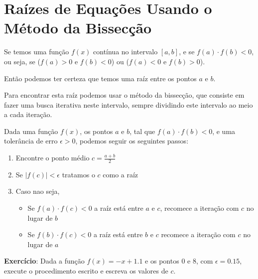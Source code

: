 \documentclass[12pt]{article}
\begin{document}
\break





\section{Raízes de Equações Usando o Método da Bissecção}

Se temos uma função $f(x)$ 
contínua no intervalo $[a, b]$, 
e se $f(a)\cdot f(b) < 0$, ou seja, 
se ($f(a)>0$ e $f(b)<0$) ou 
($f(a)<0$ e $f(b)>0$).

Então podemos ter certeza que temos uma raíz entre os
pontos $a$ e $b$.

Para encontrar esta raíz podemos usar o método da bissecção,
que consiste em fazer uma busca iterativa neste intervalo,
sempre dividindo este intervalo ao meio a cada iteração.

Dada uma função $f(x)$, os pontos $a$ e $b$, 
tal que $f(a)\cdot f(b)<0$, 
e uma tolerância de erro $\epsilon>0$,
podemos seguir os seguintes passos:

\begin{enumerate}
   \item Encontre o ponto médio $c = \frac{a+b}{2}$
   \item Se $|f(c)|<\epsilon$ tratamos o $c$ como a raíz
   \item Caso nao seja,
   \begin{itemize}
      \item Se $f(a)\cdot f(c)<0$ a raíz está entre $a$ e $c$,
      recomece a iteração com $c$ no lugar de $b$
      \item Se $f(b)\cdot f(c)<0$ a raíz está entre $b$ e $c$
      recomece a iteração com $c$ no lugar de $a$
   \end{itemize}
\end{enumerate}


\textbf{Exercício}: 
Dada a função $f(x) = -x + 1.1$ e os pontos $0$ e $8$, 
com $\epsilon=0.15$, 
execute o procedimento escrito e escreva os valores de $c$.
\end{document}
